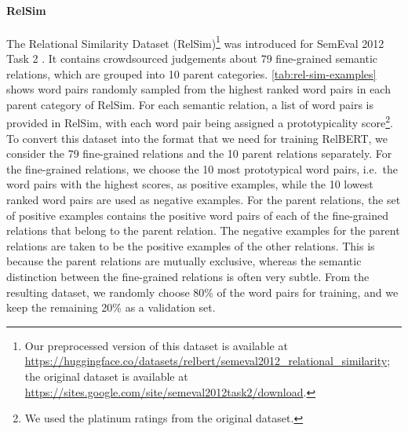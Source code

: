 \documentclass[3p]{elsarticle}
\begin{document}
{\paragraph{RelSim}
The Relational Similarity Dataset (RelSim)\footnote{Our preprocessed version of this dataset is available at \url{https://huggingface.co/datasets/relbert/semeval2012_relational_similarity}; the original dataset is available at \url{https://sites.google.com/site/semeval2012task2/download}.} was introduced for SemEval 2012 Task 2 \cite{jurgens-etal-2012-semeval}. It contains crowdsourced judgements about 79 fine-grained semantic relations, which are grouped into 10 parent categories. \autoref{tab:rel-sim-examples} shows word pairs randomly sampled from the highest ranked word pairs in each parent category of RelSim. For each semantic relation, a list of word pairs is provided in RelSim, with each word pair being assigned a prototypicality score\footnote{We used the platinum ratings from the original dataset.}. To convert this dataset into the format that we need for training RelBERT, we consider the 79 fine-grained relations and the 10 parent relations separately. For the fine-grained relations, we choose the 10 most prototypical word pairs, i.e.\ the word pairs with the highest scores, as positive examples, while the 10 lowest ranked word pairs are used as negative examples. For the parent relations, the set of positive examples contains the positive word pairs of each of the fine-grained relations that belong to the parent relation. The negative examples for the parent relations are taken to be the positive examples of the other relations. This is because the parent relations are mutually exclusive, whereas the semantic distinction between the fine-grained relations is often very subtle. From the resulting dataset, we randomly choose 80\% of the word pairs for training, and we keep the remaining 20\% as a validation set.


}
\end{document}
